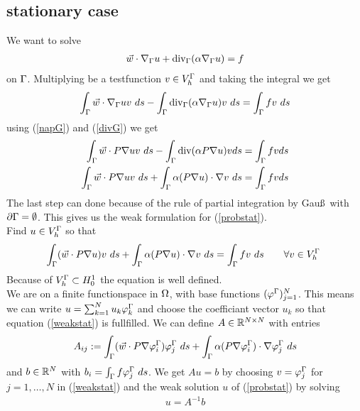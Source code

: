 \subsection{stationary case}
We want to solve 
\begin{align}
\label{probstat}
\vec w \cdot \nabla_\Gamma u + \text{div}_\Gamma(\alpha \nabla_\Gamma u)=f 
\end{align}
on $\Gamma$. Multiplying be a testfunction $v\in V^\Gamma_h$ and taking the integral we get
\begin{align*}
\int_\Gamma  \vec w \cdot \nabla_\Gamma u v\ ds
- \int_\Gamma \text{div}_\Gamma(\alpha \nabla_\Gamma u) v\ ds
= \int_\Gamma f v\ ds
\end{align*}
using (\ref{napG}) and (\ref{divG}) we get 
\begin{align}
\int_\Gamma  \vec w \cdot P\nabla u v \ ds
- \int_\Gamma \text{div}(\alpha P \nabla u) vds
= \int_\Gamma f v ds\nonumber\\
\int_\Gamma  \vec w \cdot P\nabla u v\ ds
+ \int_\Gamma \alpha (P \nabla u) \cdot \nabla v\ ds
= \int_\Gamma f v  ds
\end{align}
The last step can done because of the rule of partial integration by Gau\ss \ with $\partial \Gamma=\emptyset$. This gives us the weak formulation for (\ref{probstat}).\\
Find $u\in V^\Gamma_h$ so that
\begin{align}
\label{weakstat}
\int_\Gamma  (\vec w \cdot P\nabla u) v\ ds
+ \int_\Gamma \alpha (P \nabla u) \cdot \nabla v\ ds
= \int_\Gamma f v\ ds \qquad \forall v \in V^\Gamma_h\
\end{align}
Because of  $V^\Gamma_h\subset H^1_0$ the equation is well defined.\\
We are on a finite functionspace in $\Omega$, with base functions $(\varphi^\Gamma)_{j=1}^N$. This means we can write $u=\sum_{k=1}^N u_k \varphi^\Gamma_k$ and choose the coefficiant vector $u_k$ so that equation (\ref{weakstat}) is fullfilled. We can define $A \in \mathbb{R}^{N\times N}$ with entries
\begin{align}
\label{Aij}
A_{ij}:=\int_\Gamma  (\vec w \cdot P\nabla \varphi^\Gamma_i) \varphi^\Gamma_j\ ds + \int_\Gamma \alpha (P \nabla \varphi^\Gamma_i) \cdot \nabla \varphi^\Gamma_j\ ds
\end{align}
and $b\in \mathbb{R}^N$ with $b_i=\int_\boundary f\phix_j \ ds$. We get $Au=b$ by choosing $v=\varphi^\Gamma_j$ for $j=1,\dots,N$ in (\ref{weakstat}) and the weak solution $u$ of (\ref{probstat}) by solving
\begin{align}
u=A^{-1}b
\end{align}

